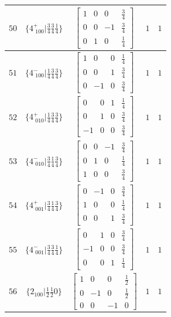 \documentclass[fleqn,8pt]{jsarticle}
\begin{document}
\begin{longtable}{ccccc}
$ 50 $ & $ \{4^{+}_{\,\,100}|\frac{3}{4} \frac{3}{4} \frac{1}{4}\} $ & $ \begin{bmatrix} 1 & 0 & 0 & \frac{3}{4} \\ 0 & 0 & -1 & \frac{3}{4} \\ 0 & 1 & 0 & \frac{1}{4} \end{bmatrix} $ & $ 1 $ & $ 1 $ \\ \hline
$ 51 $ & $ \{4^{-}_{\,\,100}|\frac{1}{4} \frac{3}{4} \frac{3}{4}\} $ & $ \begin{bmatrix} 1 & 0 & 0 & \frac{1}{4} \\ 0 & 0 & 1 & \frac{3}{4} \\ 0 & -1 & 0 & \frac{3}{4} \end{bmatrix} $ & $ 1 $ & $ 1 $ \\ \hline
$ 52 $ & $ \{4^{+}_{\,\,010}|\frac{1}{4} \frac{3}{4} \frac{3}{4}\} $ & $ \begin{bmatrix} 0 & 0 & 1 & \frac{1}{4} \\ 0 & 1 & 0 & \frac{3}{4} \\ -1 & 0 & 0 & \frac{3}{4} \end{bmatrix} $ & $ 1 $ & $ 1 $ \\ \hline
$ 53 $ & $ \{4^{-}_{\,\,010}|\frac{3}{4} \frac{1}{4} \frac{3}{4}\} $ & $ \begin{bmatrix} 0 & 0 & -1 & \frac{3}{4} \\ 0 & 1 & 0 & \frac{1}{4} \\ 1 & 0 & 0 & \frac{3}{4} \end{bmatrix} $ & $ 1 $ & $ 1 $ \\ \hline
$ 54 $ & $ \{4^{+}_{\,\,001}|\frac{3}{4} \frac{1}{4} \frac{3}{4}\} $ & $ \begin{bmatrix} 0 & -1 & 0 & \frac{3}{4} \\ 1 & 0 & 0 & \frac{1}{4} \\ 0 & 0 & 1 & \frac{3}{4} \end{bmatrix} $ & $ 1 $ & $ 1 $ \\ \hline
$ 55 $ & $ \{4^{-}_{\,\,001}|\frac{3}{4} \frac{3}{4} \frac{1}{4}\} $ & $ \begin{bmatrix} 0 & 1 & 0 & \frac{3}{4} \\ -1 & 0 & 0 & \frac{3}{4} \\ 0 & 0 & 1 & \frac{1}{4} \end{bmatrix} $ & $ 1 $ & $ 1 $ \\ \hline
$ 56 $ & $ \{2{}_{100}|\frac{1}{2} \frac{1}{2} 0\} $ & $ \begin{bmatrix} 1 & 0 & 0 & \frac{1}{2} \\ 0 & -1 & 0 & \frac{1}{2} \\ 0 & 0 & -1 & 0 \end{bmatrix} $ & $ 1 $ & $ 1 $ \\ \hline

\end{longtable}
\end{document}
